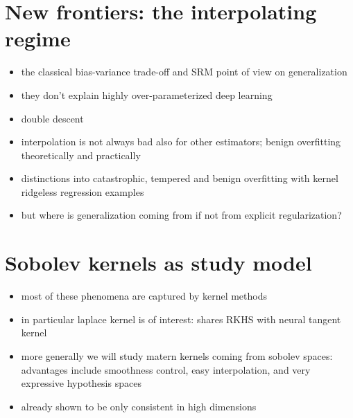 \section{New frontiers: the interpolating regime}
\begin{itemize}
    \item the classical bias-variance trade-off and SRM point of 
        view on generalization \cite{vapnik}
    \item they don't explain highly over-parameterized deep learning
        \cite{fitwithoutfear,understandkernel,rethink}
    \item double descent \cite{reconciling,twomodels}
    \item interpolation is not always bad also for other estimators; 
        benign overfitting theoretically \cite{benignlinear,benignridge}
        and practically \cite{justinterpolate,surprises}
    \item distinctions into catastrophic, tempered and benign overfitting
        with kernel ridgeless regression examples \cite{taxonomy}
    \item but where is generalization coming from if not from 
        explicit regularization? 
        \cite{benignimplicit,justinterpolate,deepimplicitreg}
\end{itemize}

\section{Sobolev kernels as study model}
\begin{itemize}
    \item most of these phenomena are captured by kernel methods
        \cite{justinterpolate,understandkernel}
    \item in particular laplace kernel is of interest: shares RKHS with
        neural tangent kernel \cite{ntk,ntklaplace}
    \item more generally we will study matern kernels coming from sobolev
        spaces: advantages include smoothness control, easy interpolation,
        and very expressive hypothesis spaces
    \item already shown to be only consistent in high dimensions 
        \cite{laplaceconsistency,sobolevconsistency}
\end{itemize}